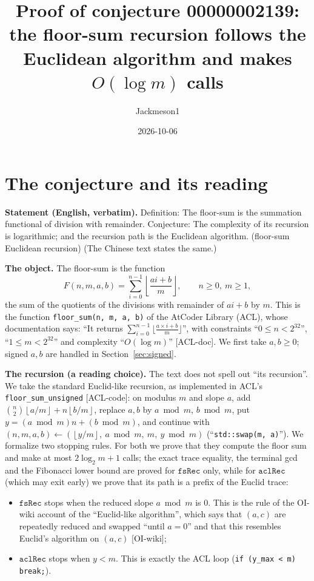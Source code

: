 \documentclass[11pt]{article}
\title{Proof of conjecture 00000002139:\\ the floor-sum recursion follows the Euclidean algorithm and makes $O(\log m)$ calls}
\author{Jackmeson1}
\date{2026-10-06}
\theoremstyle{definition}
\newcommand{\fl}[1]{\left\lfloor #1 \right\rfloor}
\begin{document}
\maketitle

\section{The conjecture and its reading}

\textbf{Statement (English, verbatim).} Definition: The floor-sum is the summation functional of
division with remainder. Conjecture: The complexity of its recursion is logarithmic; and the
recursion path is the Euclidean algorithm. (floor-sum Euclidean recursion)
(The Chinese text states the same.)

\textbf{The object.} The floor-sum is the function
\[
  F(n,m,a,b)=\sum_{i=0}^{n-1}\fl{\frac{a i+b}{m}},\qquad n\ge 0,\ m\ge 1,
\]
the sum of the quotients of the divisions with remainder of $ai+b$ by $m$. This is the function
\texttt{floor\_sum(n, m, a, b)} of the AtCoder Library (ACL), whose documentation says: ``It returns
$\sum_{i = 0}^{n - 1} \lfloor \frac{a \times i + b}{m} \rfloor$'', with constraints
``$0 \leq n < 2^{32}$'', ``$1 \leq m < 2^{32}$'' and complexity ``$O(\log m)$''
[ACL-doc]. We first take $a,b\ge 0$; signed $a,b$ are handled in Section~\ref{sec:signed}.

\textbf{The recursion (a reading choice).} The text does not spell out ``its recursion''. We take
the standard Euclid-like recursion, as implemented in ACL's \texttt{floor\_sum\_unsigned}
[ACL-code]: on modulus $m$ and slope $a$, add $\binom{n}{2}\fl{a/m}+n\fl{b/m}$, replace $a,b$ by
$a\bmod m$, $b\bmod m$, put $y=(a\bmod m)n+(b\bmod m)$, and continue with
$(n,m,a,b)\leftarrow(\fl{y/m},\ a\bmod m,\ m,\ y\bmod m)$ (``\texttt{std::swap(m, a)}''). We formalize
two stopping rules. For both we prove that they compute the floor sum and make at most $2\log_2 m+1$ calls; the exact trace equality, the terminal gcd and the Fibonacci lower bound are proved for $\mathtt{fsRec}$ only, while for $\mathtt{aclRec}$ (which may exit early) we prove that its path is a prefix of the Euclid trace:
\begin{itemize}
\item $\mathtt{fsRec}$ stops when the reduced slope $a\bmod m$ is $0$. This is the rule of the
  OI-wiki account of the ``Euclid-like algorithm'', which says that $(a,c)$ are repeatedly reduced
  and swapped ``until $a=0$'' and that this resembles Euclid's algorithm on $(a,c)$ [OI-wiki];
\item $\mathtt{aclRec}$ stops when $y<m$. This is exactly the ACL loop (\texttt{if (y\_max < m) break;}).
\end{itemize}
\end{document}
